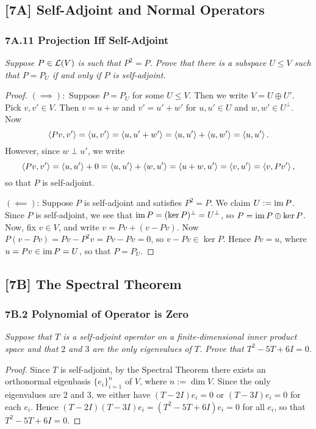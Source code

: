 \documentclass{article}
\begin{document}
\subsection*{[7A] Self-Adjoint and Normal Operators}
\subsubsection*{7A.11 Projection Iff Self-Adjoint}
\textit{Suppose $P\in\mathcal L(V)$ is such that $P^2=P$. Prove that there is a subspace $U\leq V$ such that $P = P_U$ if and only if $P$ is self-adjoint.}
\begin{proof}
$(\implies):$ Suppose $P=  P_U$ for some $U\leq V$. Then we write $V = U\oplus U'$. Pick $v, v'\in V$. Then $v = u+w$ and $v' = u' + w'$ for $u, u'\in U$ and $w, w'\in U^\perp$. Now
$$\left\langle Pv, v'\right\rangle  = \left\langle u, v'\right\rangle = \left\langle u, u'+w'\right\rangle = \left\langle u, u'\right\rangle + \left\langle u, w'\right\rangle = \left\langle u, u'\right\rangle.$$
However, since $w\perp u'$, we write
$$\left\langle Pv, v'\right\rangle = \left\langle u, u'\right\rangle + 0 = \left\langle u, u'\right\rangle+\left\langle w, u'\right\rangle = \left\langle u+w, u'\right\rangle = \left\langle v, u'\right\rangle = \left\langle v, Pv'\right\rangle,$$
so that $P$ is self-adjoint.

$(\impliedby)$: Suppose $P$ is self-adjoint and satisfies $P^2 = P$. We claim $U := \operatorname{im} P$. Since $P$ is self-adjoint, we see that $\operatorname{im} P = (\ker P)^\perp = U^\perp$, so $P = \operatorname{im} P\oplus \ker P$. Now, fix $v\in V$, and write $v = Pv + (v - Pv)$. Now $P(v-Pv) = Pv - P^2v = Pv-Pv = 0$, so $v-Pv\in \ker P$. Hence $Pv = u$, where $u = Pv\in \operatorname{im} P = U$, so that $P = P_U$.
\end{proof}
\subsection*{[7B] The Spectral Theorem}
\subsubsection*{7B.2 Polynomial of Operator is Zero}
\textit{Suppose that $T$ is a self-adjoint operator on a finite-dimensional inner product space and that $2$ and $3$ are the only eigenvalues of $T$. Prove that $T^2-5T + 6I = 0$.}
\begin{proof}
Since $T$ is self-adjoint, by the Spectral Theorem there exists an orthonormal eigenbasis $\{e_i\}_{i=1}^n$ of $V$, where $n := \dim V$. Since the only eigenvalues are $2$ and $3$, we either have $(T-2I)e_i = 0$ or $(T-3I)e_i = 0$ for each $e_i$. Hence $(T-2I)(T-3I)e_i = (T^2-5T+6I)e_i = 0$ for all $e_i$, so that $T^2 - 5T + 6I = 0$.
\end{proof}
\end{document}
